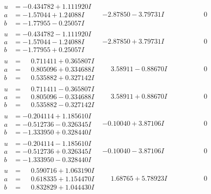 \documentclass[1p]{elsarticle_modified}
\theoremstyle{definition}
\begin{document}
$$\begin{array}{c|c|c}
\begin{aligned}
u &= -0.434782 + 1.111920 I \\
a &= -1.57044 + 1.24088 I \\
b &= -1.77955 - 0.25057 I\end{aligned}
 & -2.87850 - 3.79731 I & \phantom{-0.000000 } 0 \\ \hline\begin{aligned}
u &= -0.434782 - 1.111920 I \\
a &= -1.57044 - 1.24088 I \\
b &= -1.77955 + 0.25057 I\end{aligned}
 & -2.87850 + 3.79731 I & \phantom{-0.000000 } 0 \\ \hline\begin{aligned}
u &= \phantom{-}0.711411 + 0.365807 I \\
a &= \phantom{-}0.805096 + 0.334688 I \\
b &= \phantom{-}0.535882 + 0.327142 I\end{aligned}
 & \phantom{-}3.58911 - 0.88670 I & \phantom{-0.000000 } 0 \\ \hline\begin{aligned}
u &= \phantom{-}0.711411 - 0.365807 I \\
a &= \phantom{-}0.805096 - 0.334688 I \\
b &= \phantom{-}0.535882 - 0.327142 I\end{aligned}
 & \phantom{-}3.58911 + 0.88670 I & \phantom{-0.000000 } 0 \\ \hline\begin{aligned}
u &= -0.204114 + 1.185610 I \\
a &= -0.512736 - 0.326345 I \\
b &= -1.333950 + 0.328440 I\end{aligned}
 & -0.10040 + 3.87106 I & \phantom{-0.000000 } 0 \\ \hline\begin{aligned}
u &= -0.204114 - 1.185610 I \\
a &= -0.512736 + 0.326345 I \\
b &= -1.333950 - 0.328440 I\end{aligned}
 & -0.10040 - 3.87106 I & \phantom{-0.000000 } 0 \\ \hline\begin{aligned}
u &= \phantom{-}0.590716 + 1.063190 I \\
a &= \phantom{-}0.618335 + 1.154470 I \\
b &= \phantom{-}0.832829 + 1.044430 I\end{aligned}
 & \phantom{-}1.68765 + 5.78923 I & \phantom{-0.000000 } 0 \\ \hline\begin{aligned}

\end{aligned}
\end{array}$$
\end{document}

